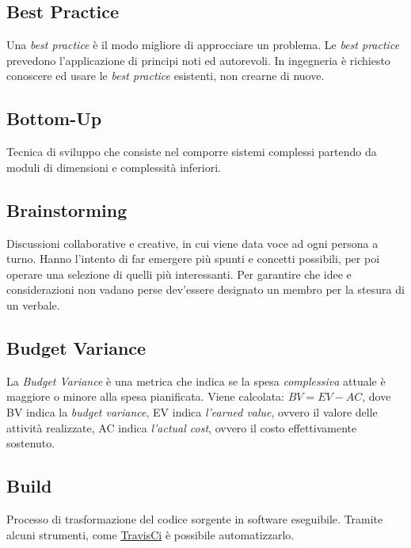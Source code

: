 	\subsection{Best Practice}
	\label{sec:bestpractice}
	Una \emph{best practice} è il modo migliore di approcciare un problema. Le \emph{best practice} prevedono l'applicazione di principi noti ed autorevoli. In ingegneria è richiesto conoscere ed usare le \emph{best practice} esistenti, non crearne di nuove.


	\subsection{Bottom-Up}
	\label{sec:bottomup}
	Tecnica di sviluppo che consiste nel comporre sistemi complessi partendo da moduli di dimensioni e complessità inferiori.


	\subsection{Brainstorming}
	\label{sec:brainstorming}
	Discussioni collaborative e creative, in cui viene data voce ad ogni persona a turno. Hanno l'intento di far emergere più spunti e concetti possibili, per poi operare una selezione di quelli più interessanti. Per garantire che idee e considerazioni non vadano perse dev'essere designato un membro per la stesura di un verbale.


	\subsection{Budget Variance}
	\label{sec:budgetvariance}
	La \emph{Budget Variance} è una metrica che indica se la spesa \textit{complessiva} attuale è maggiore o minore alla spesa pianificata. Viene calcolata: $BV = EV - AC$, dove BV indica la \emph{budget variance}, EV indica \emph{l'earned value}, ovvero il valore delle attività realizzate, AC indica \emph{l'actual cost}, ovvero il costo effettivamente sostenuto.
	\subsection{Build}
	\label{sec:build}
	Processo di trasformazione del codice sorgente in software eseguibile. Tramite alcuni strumenti, come \underline{\hyperref[sec:travisci]{TravisCi}} è possibile automatizzarlo.

	\newpage


